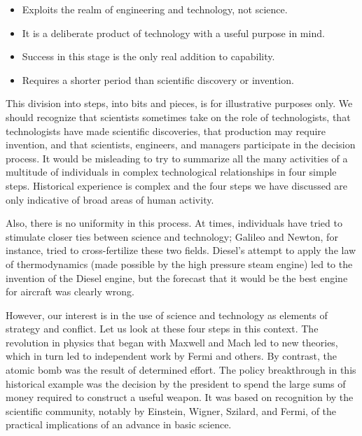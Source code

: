  \begin{mdframed}[nobreak=true, backgroundcolor=ApricotWhite, frametitle={CHART 7: The Engineering Breakthrough}] 
    \begin{itemize}
        \item Exploits the realm of engineering and technology, not science.
        \item It is a deliberate product of technology with a useful purpose in mind.
        \item Success in this stage is the only real addition to capability.
        \item Requires a shorter period than scientific discovery or invention.
    \end{itemize}
\end{mdframed}

This division into steps, into bits and pieces, is for illustrative purposes only. We should recognize that scientists sometimes take on the role of technologists, that technologists have made scientific discoveries, that production may require invention, and that scientists, engineers, and managers participate in the decision process. It would be misleading to try to summarize all the many activities of a multitude of individuals in complex technological relationships in four simple steps. Historical experience is complex and the four steps we have discussed are only indicative of broad areas of human activity.

Also, there is no uniformity in this process. At times, individuals have tried to stimulate closer ties between science and technology; Galileo and Newton, for instance, tried to cross-fertilize these two fields. Diesel's attempt to apply the law of thermodynamics (made possible by the high pressure steam engine) led to the invention of the Diesel engine, but the forecast that it would be the best engine for aircraft was clearly wrong.

However, our interest is in the use of science and technology as elements of strategy and conflict. Let us look at these four steps in this context. The revolution in physics that began with Maxwell and Mach led to new theories, which in turn led to independent work by Fermi and others. By contrast, the atomic bomb was the result of determined effort. The policy breakthrough in this historical example was the decision by the president to spend the large sums of money required to construct a useful weapon. It was based on recognition by the scientific community, notably by Einstein, Wigner, Szilard, and Fermi, of the practical implications of an advance in basic science.

